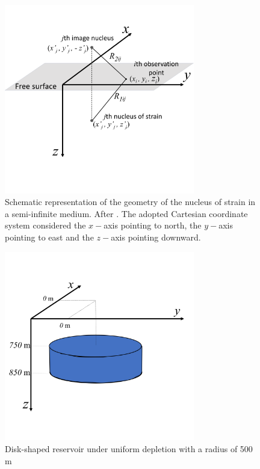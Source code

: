 \documentclass[journal abbreviation, manuscript]{copernicus}
\begin{document}
\clearpage

\begin{figure}[h]
\includegraphics[width=8.3cm]{Fig/Figure_Nucleus_Strain.png}
\caption{Schematic representation of the geometry of the nucleus of strain in a semi-infinite medium. After \cite{Munoz&Roehl17}. 
The adopted Cartesian coordinate system considered the $x-$axis pointing to north, the $y-$axis pointing to east and the $z-$axis pointing downward.} 
\label{fig:nucleus_strain}
\end{figure}


\begin{figure}[h]
\includegraphics[width=8.3cm]{Fig/Figure_Cylinder.png}
\caption{Disk-shaped reservoir under uniform depletion with a radius of 500 m}
\label{fig:cylinder}
\end{figure}
\end{document}
